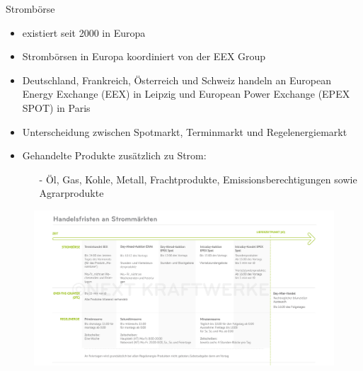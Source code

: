 \documentclass[aspectratio=1610, professionalfonts, 9pt]{beamer}
\begin{document}
\begin{frame}{Strombörse}
\begin{itemize}
  \item existiert seit \num{2000} in Europa
  \item Strombörsen in Europa koordiniert von der EEX Group
  \item Deutschland, Frankreich, Österreich
  und Schweiz handeln an European Energy Exchange (EEX) in Leipzig
 und European Power Exchange (EPEX SPOT) in Paris
 \item Unterscheidung zwischen Spotmarkt, Terminmarkt und Regelenergiemarkt
\item Gehandelte Produkte zusätzlich zu Strom:
    \begin{itemize}
      \item[-]Öl, Gas, Kohle, Metall, Frachtprodukte,
       Emissionsberechtigungen sowie Agrarprodukte
    \end{itemize}
\end{itemize}
\end{frame}


{
\begin{frame}
  \begin{figure}
  \includegraphics[width=1.1\textwidth]{images/stromprodukte.jpg}
\end{figure}
\end{frame}
}
\end{document}
